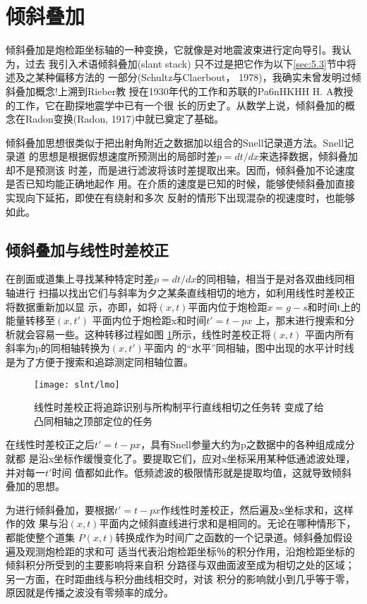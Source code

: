\section{倾斜叠加}
\label{sec:5.2}

倾斜叠加是炮检距坐标轴的一种变换，它就像是对地震波束进行定向导引。我认为，过去
我引入术语倾斜叠加(slant stack)
只不过是把它作为以下\ref{sec:5.3}节中将述及之某种偏移方法的
一部分(Schultz与Claerbout，
1978)，我确实未曾发明过倾斜叠加概念!上溯到Rieber教
授在1930年代的工作和苏联的Pa6nHKHH H.
A教授的工作，它在勘探地震学中已有一个很
长的历史了。从数学上说，倾斜叠加的概念在Radon变换(Radon,
1917)中就已奠定了基础。

倾斜叠加思想很类似于把出射角附近之数据加以组合的Snell记录道方法。Snell记录道
的思想是根据假想速度所预测出的局部时差$p=dt/dx$来选择数据，倾斜叠加却不是预测该
时差，而是进行滤波将该时差提取出来。因而，倾斜叠加不论速度是否已知均能正确地起作
用。在介质的速度是已知的时候，能够使倾斜叠加直接实现向下延拓，即使在有绕射和多次
反射的情形下出现混杂的视速度时，也能够如此。

\subsection{倾斜叠加与线性时差校正}
\label{sec:5.2.1}

在剖面或道集上寻找某种特定时差$p=dt/dx$的同相轴，相当于是对各双曲线同相轴进行
扫描以找出它们与斜率为夕之某条直线相切的地方，如利用线性时差校正将数据重新加以显
示，亦即，如将$(x,t)$平面内位于炮检距$x=g-s$和时间t上的能量转移至$(x,t')$
平面内位于炮检距x和时间$t'=t-px$
上，那末进行搜索和分析就会容易一些。这种转移过程如图
\ref{fig:slnt/lmo}所示，线性时差校正将$(x,t)$
平面内所有斜率为p的同相轴转换为$(x,t')$平面内
的“水平”同相轴，图中出现的水平计时线是为了方便于搜索和追踪测定同相轴位置。

\begin{figure}[H]
\centering
\texttt{[image: slnt/lmo]}
\caption[lmo]{线性时差校正将追踪识别与所构制平行直线相切之任务转
变成了给凸同相轴之顶部定位的任务}
\label{fig:slnt/lmo}
\end{figure}

在线性时差校正之后$t'=t-px$，具有Snell参量大约为p之数据中的各种组成成分就都
是沿x坐标作缓慢变化了。要提取它们，应对x坐标采用某种低通滤波处理，并对每一$t'$时间
值都如此作。低频滤波的极限情形就是提取均值，这就导致倾斜叠加的思想。

为进行倾斜叠加，要根据$t'=t-px$作线性时差校正，然后遍及x坐标求和，这样作的效
果与沿$(x,t)$平面内之倾斜直线进行求和是相同的。无论在哪种情形下，都能使整个道集
$P(x,t)$转换成作为时间广之函数的一个记录道。倾斜叠加假设遍及观测炮检距的求和可
适当代表沿炮检距坐标％的积分作用，沿炮检距坐标的倾斜积分所受到的主要影响将来自积
分路径与双曲面波至成为相切之处的区域；另一方面，在时距曲线与积分曲线相交时，对该
积分的影响就小到几乎等于零，原因就是传播之波没有零频率的成分。

